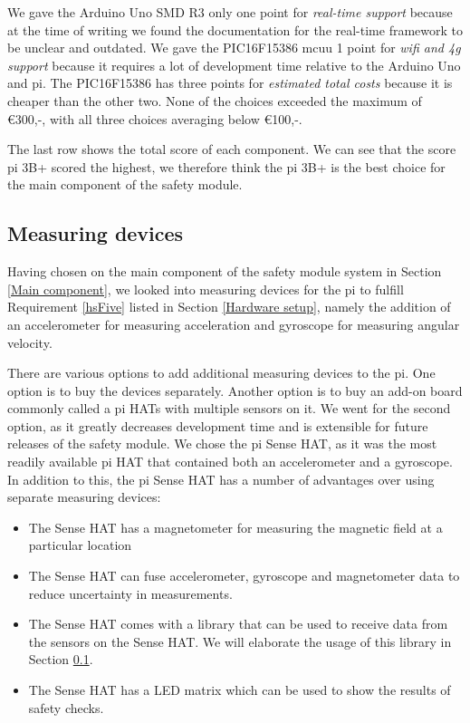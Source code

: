\documentclass[12pt]{scrreprt}
\begin{document}
We gave the Arduino Uno SMD R3 only one point for \textit{real-time support} because at the time of writing we found the documentation for the real-time framework to be unclear and outdated. We gave the PIC16F15386 \gls{mcuu} 1 point for \textit{\gls{wifi} and \gls{4g} support} because it requires a lot of development time relative to the Arduino Uno and \gls{pi}. The PIC16F15386 has three points for \textit{estimated total costs} because it is cheaper than the other two. None of the choices exceeded the maximum of €300,-, with all three choices averaging below €100,-.
\par
The last row shows the total score of each component. We can see that the score \gls{pi} 3B+ scored the highest, we therefore think the \gls{pi} 3B+ is the best choice for the main component of the safety module.

\subsection{Measuring devices}
Having chosen on the main component of the safety module system in Section \ref{Main component}, we looked into measuring devices for the \gls{pi} to fulfill Requirement \ref{hsFive} listed in Section \ref{Hardware setup}, namely the addition of an accelerometer for measuring acceleration and gyroscope for measuring angular velocity.
\par
There are various options to add additional measuring devices to the \gls{pi}. One option is to buy the devices separately. Another option is to buy an add-on board commonly called a \gls{pi} HATs with multiple sensors on it. We went for the second option, as it greatly decreases development time and is extensible for future releases of the safety module. We chose the \gls{pi} Sense HAT, as it was the most readily available \gls{pi} HAT that contained both an accelerometer and a gyroscope. In addition to this, the \gls{pi} Sense HAT has a number of advantages over using separate measuring devices:

\begin{itemize}
    \item The Sense HAT has a magnetometer for measuring the magnetic field at a particular location
    \item The Sense HAT can fuse accelerometer, gyroscope and magnetometer data to reduce uncertainty in measurements.
    \item The Sense HAT comes with a library that can be used to receive data from the sensors on the Sense HAT. We will elaborate the usage of this library in Section \ref{}.
    \item The Sense HAT has a LED matrix which can be used to show the results of safety checks.
\end{itemize}
\end{document}
